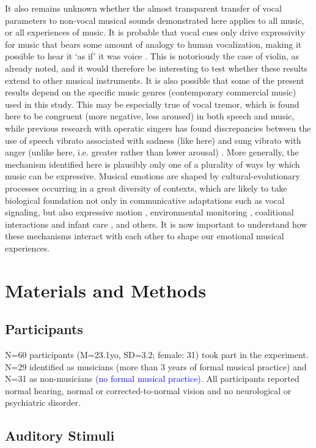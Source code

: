 \documentclass[openacc]{rsprocb_new}%
\begin{document}
It also remains unknown whether the almost transparent transfer of vocal parameters to non-vocal musical sounds demonstrated here applies to all music, or all experiences of music. It is probable that vocal cues only drive expressivity for music that bears some amount of  analogy to human vocalization, making it possible to hear it `as if' it was voice \cite{KIV89}. This is notoriously the case of violin, as already noted, and it would therefore be interesting to test whether these results extend to other musical instruments. It is also possible that some of the present results depend on the specific music genres (contemporary commercial music) used in this study. This may be especially true of vocal tremor, which is found here to be congruent (more negative, less aroused) in both speech and music, while previous research with operatic singers has found discrepancies between the use of speech vibrato associated with sadness (like here) and sung vibrato with anger (unlike here, i.e. greater rather than lower arousal) \cite{SCH15}. More generally, the mechanism identified here is plausibly only one of a plurality of ways by which music can be expressive. Musical emotions are shaped by cultural-evolutionary processes occurring in a great diversity of contexts, which are likely to take biological foundation not only in communicative adaptations such as vocal signaling, but also expressive motion \cite{GIO14}, environmental monitoring \cite{MA15}, coalitional interactions and infant care \cite{MEHR20}, and others. It is now important to understand how these mechanisms interact with each other to shape our emotional musical experiences.   

\section*{Materials and Methods}
\subsection*{Participants} 

N=60 participants (M=23.1yo, SD=3.2; female: 31) took part in the experiment. N=29 identified as musicians (more than 3 years of formal musical practice) and N=31 as non-musicians \textcolor{blue}{(no formal musical practice)}. All participants reported normal hearing, normal or corrected-to-normal vision and no neurological or psychiatric disorder. 

\subsection*{Auditory Stimuli} 
\end{document}
